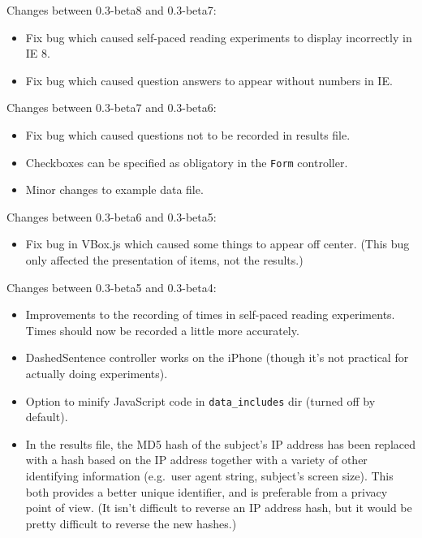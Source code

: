 \documentclass[]{article}
\begin{document}
Changes between 0.3-beta8 and 0.3-beta7:

\begin{itemize}
\itemsep1pt\parskip0pt
\item
  Fix bug which caused self-paced reading experiments to display
  incorrectly in IE 8.
\item
  Fix bug which caused question answers to appear without numbers in IE.
\end{itemize}

Changes between 0.3-beta7 and 0.3-beta6:

\begin{itemize}
\itemsep1pt\parskip0pt
\item
  Fix bug which caused questions not to be recorded in results file.
\item
  Checkboxes can be specified as obligatory in the \texttt{Form}
  controller.
\item
  Minor changes to example data file.
\end{itemize}

Changes between 0.3-beta6 and 0.3-beta5:

\begin{itemize}
\itemsep1pt\parskip0pt
\item
  Fix bug in VBox.js which caused some things to appear off center.
  (This bug only affected the presentation of items, not the results.)
\end{itemize}

Changes between 0.3-beta5 and 0.3-beta4:

\begin{itemize}
\item
  Improvements to the recording of times in self-paced reading
  experiments. Times should now be recorded a little more accurately.
\item
  DashedSentence controller works on the iPhone (though it's not
  practical for actually doing experiments).
\item
  Option to minify JavaScript code in \texttt{data\_includes} dir
  (turned off by default).
\item
  In the results file, the MD5 hash of the subject's IP address has been
  replaced with a hash based on the IP address together with a variety
  of other identifying information (e.g.~user agent string, subject's
  screen size). This both provides a better unique identifier, and is
  preferable from a privacy point of view. (It isn't difficult to
  reverse an IP address hash, but it would be pretty difficult to
  reverse the new hashes.)
\end{itemize}
\end{document}
